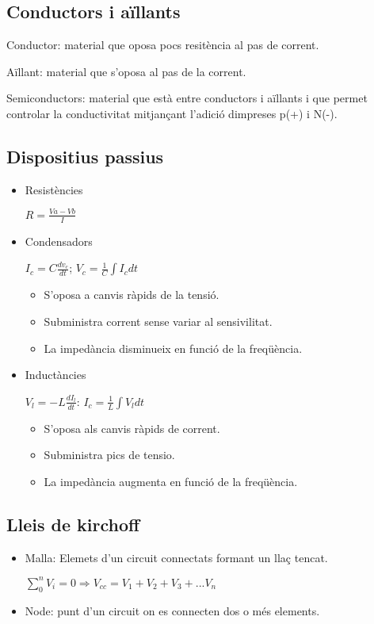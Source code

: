 \documentclass{article}
\begin{document}
\subsection{Conductors i aïllants}

Conductor: material que oposa pocs resitència al pas de corrent.

Aïllant: material que s'oposa al pas de la corrent.

Semiconductors: material que està entre conductors i aïllants i que permet controlar la conductivitat mitjançant l'adició dimpreses p(+) i N(-).

\subsection{Dispositius passius}

\begin{itemize}
	\item Resistències

$R = \frac{Va - Vb}{I}$

	\item Condensadors

$I_c = C \frac{dv_c}{dt}$; $V_c = \frac{1}{C} \int I_c dt$
	\begin{itemize}
		\item S'oposa a canvis ràpids de la tensió.
		\item Subministra corrent sense variar al sensivilitat.
		\item La impedància disminueix en funció de la freqüència.
	\end{itemize}
	\item Inductàncies

$V_l = -L \frac{dI_l}{dt}$: $I_c = \frac{1}{L} \int V_l dt$

	\begin{itemize}
		\item S'oposa als canvis ràpids de corrent.
		\item Subministra pics de tensio.
		\item La impedància augmenta en funció de la freqüència.
	\end{itemize}
\end{itemize}

\subsection{Lleis de kirchoff}
	\begin{itemize}
		\item Malla: Elemets d'un circuit connectats formant un llaç tencat.

$\sum_0^nV_i = 0 \Rightarrow V_{cc} = V_1 + V_2 + V_3 + ... V_n$

		\item Node: punt d'un circuit on es connecten dos o més elements.
	\end{itemize}
\end{document}
